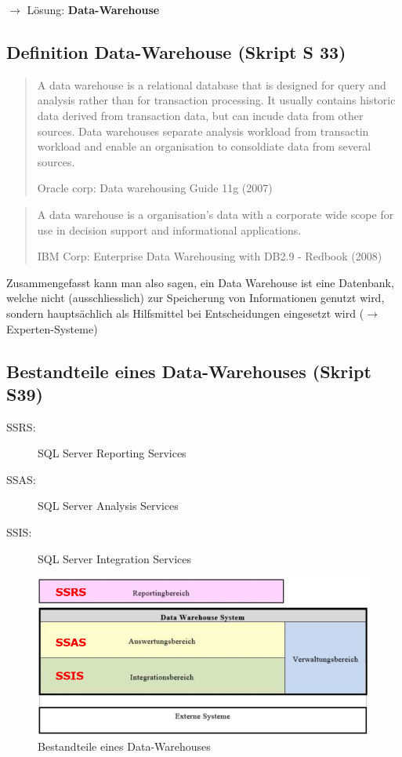 \documentclass[a4paper, 11pt]{article}
\begin{document}
$\rightarrow$ Lösung: \textbf{Data-Warehouse}

\newpage

\subsection{Definition Data-Warehouse (Skript S 33)}
	
\blockquote[Oracle corp: Data warehousing Guide 11g (2007)]{A data warehouse is a relational database that is designed for query and analysis rather than for transaction processing. It usually contains historic data derived from transaction data, but can incude data from other sources. Data warehouses separate analysis workload from transactin workload and enable an organisation to consoldiate data from several sources.} 
 

\blockquote[IBM Corp: Enterprise Data Warehousing with DB2.9 - Redbook (2008)]{A data warehouse is a organisation's data with a corporate wide scope for use in decision support and informational applications.}
\vspace*{10px}

Zusammengefasst kann man also sagen, ein Data Warehouse ist eine Datenbank, welche nicht (ausschliesslich) zur Speicherung von Informationen genutzt wird, sondern hauptsächlich als Hilfsmittel bei Entscheidungen eingesetzt wird ($\rightarrow$ Experten-Systeme)



\subsection{Bestandteile eines Data-Warehouses (Skript S39)}

\begin{description}
	\item [SSRS: ] SQL Server Reporting Services
	\item [SSAS: ] SQL Server Analysis Services
	\item [SSIS: ] SQL Server Integration Services
\end{description}

\begin{figure}[htb]
	\centering
	\includegraphics[keepaspectratio=true,height=15\baselineskip]{bestandteiledatawarehouse.PNG}
	\caption{Bestandteile eines Data-Warehouses}
	\label{fig:bstdw}
\end{figure}
\end{document}
